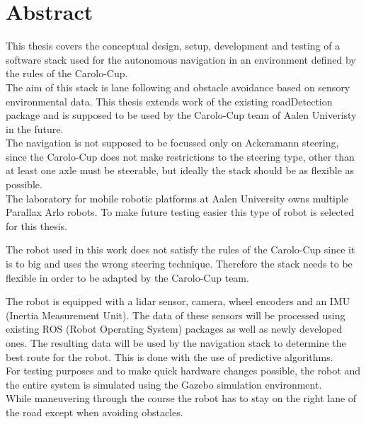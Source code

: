 \chapter*{Abstract}
\label{abstract}
This thesis covers the conceptual design, setup, development and testing of a software stack used for the autonomous navigation in an environment defined by the rules of the Carolo-Cup.\\

 The aim of this stack is lane following and obstacle avoidance based on sensory environmental data. This thesis extends work of the existing roadDetection package and is supposed to be used by the Carolo-Cup team of Aalen Univeristy in the future.\\
 
 The navigation is not supposed to be focussed only on Ackeramann steering, since the Carolo-Cup does not make restrictions to the steering type, other than at least one axle must be steerable, but ideally the stack should be as flexible as possible\cite{carolocup}.\\
 The laboratory for mobile robotic platforms at Aalen University owns multiple Parallax Arlo robots. To make future testing easier this type of robot is selected for this thesis.

 The robot used in this work does not satisfy the rules of the Carolo-Cup since it is to big and uses the wrong steering technique. Therefore the stack needs to be flexible in order to be adapted by the Carolo-Cup team.

The robot is equipped with a lidar sensor, camera, wheel encoders and an IMU (Inertia Measurement Unit). The data of these sensors will be processed using existing ROS (Robot Operating System) packages as well as newly developed ones. The resulting data will be used by the navigation stack to determine the best route for the robot. This is done with the use of predictive algorithms.\\

For testing purposes and to make quick hardware changes possible, the robot and the entire system is simulated using the Gazebo simulation environment.\\

While maneuvering through the course the robot has to stay on the right lane of the road except when avoiding obstacles.